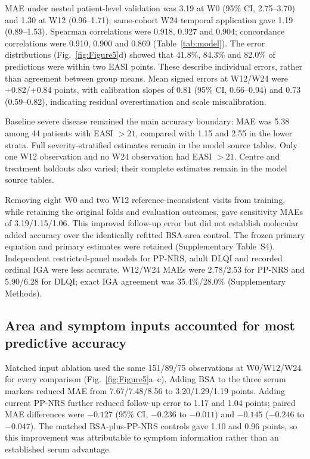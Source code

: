 MAE under nested patient-level validation was 3.19 at W0 (95\% CI, 2.75--3.70) and 1.30 at W12 (0.96--1.71); same-cohort W24 temporal application gave 1.19 (0.89--1.53). Spearman correlations were 0.918, 0.927 and 0.904; concordance correlations were 0.910, 0.900 and 0.869 (Table~\ref{tab:model}). The error distributions (Fig.~\ref{fig:Figure5}d) showed that 41.8\%, 84.3\% and 82.0\% of predictions were within two EASI points. These describe individual errors, rather than agreement between group means. Mean signed errors at W12/W24 were +0.82/+0.84 points, with calibration slopes of 0.81 (95\% CI, 0.66--0.94) and 0.73 (0.59--0.82), indicating residual overestimation and scale miscalibration.


\begin{samepage}
Baseline severe disease remained the main accuracy boundary: MAE was 5.38 among 44 patients with EASI $>21$, compared with 1.15 and 2.55 in the lower strata. Full severity-stratified estimates remain in the model source tables. Only one W12 observation and no W24 observation had EASI $>21$. Centre and treatment holdouts also varied; their complete estimates remain in the model source tables.\par
\end{samepage}

Removing eight W0 and two W12 reference-inconsistent visits from training, while retaining the original folds and evaluation outcomes, gave sensitivity MAEs of 3.19/1.15/1.06. This improved follow-up error but did not establish molecular added accuracy over the identically refitted BSA-area control. The frozen primary equation and primary estimates were retained (Supplementary Table~S4). Independent restricted-panel models for PP-NRS, adult DLQI and recorded ordinal IGA were less accurate. W12/W24 MAEs were 2.78/2.53 for PP-NRS and 5.90/6.28 for DLQI; exact IGA agreement was 35.4\%/28.0\% (Supplementary Methods).

\subsection{Area and symptom inputs accounted for most predictive accuracy}
Matched input ablation used the same 151/89/75 observations at W0/W12/W24 for every comparison (Fig.~\ref{fig:Figure5}a--c). Adding BSA to the three serum markers reduced MAE from 7.67/7.48/8.56 to 3.20/1.29/1.19 points. Adding current PP-NRS further reduced follow-up error to 1.17 and 1.04 points; paired MAE differences were $-0.127$ (95\% CI, $-0.236$ to $-0.011$) and $-0.145$ ($-0.246$ to $-0.047$). The matched BSA-plus-PP-NRS controls gave 1.10 and 0.96 points, so this improvement was attributable to symptom information rather than an established serum advantage.

